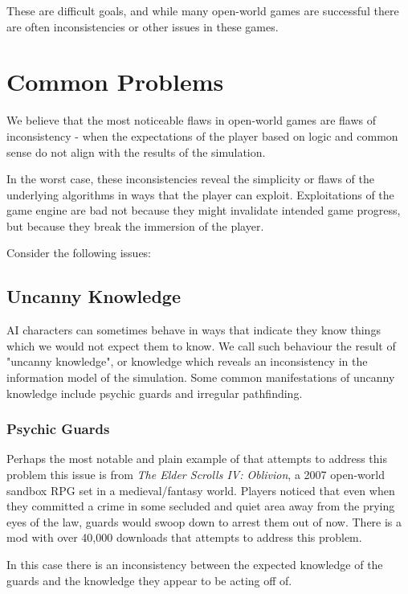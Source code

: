 These are difficult goals, and while many open-world games are successful there are often inconsistencies or other issues in these games.

\section{Common Problems}

We believe that the most noticeable flaws in open-world games are flaws of inconsistency - when the expectations of the player based on logic and common sense do not align with the results of the simulation.

In the worst case, these inconsistencies reveal the simplicity or flaws of the underlying algorithms in ways that the player can exploit. Exploitations of the game engine are bad not because they might invalidate intended game progress, but because they break the immersion of the player.

Consider the following issues:

\subsection{Uncanny Knowledge}

AI characters can sometimes behave in ways that indicate they know things which we would not expect them to know. We call such behaviour the result of "uncanny knowledge", or knowledge which reveals an inconsistency in the information model of the simulation. Some common manifestations of uncanny knowledge include psychic guards and irregular pathfinding.

\subsubsection{Psychic Guards}

Perhaps the most notable and plain example of that attempts to address this problem this issue is from \textit{The Elder Scrolls IV: Oblivion}, a 2007 open-world sandbox RPG set in a medieval/fantasy world. Players noticed that even when they committed a crime in some secluded and quiet area away from the prying eyes of the law, guards would swoop down to arrest them out of now. There is a mod with over 40,000 downloads that attempts to address this problem.\cite{psychic_guards}

In this case there is an inconsistency between the expected knowledge of the guards and the knowledge they appear to be acting off of.

